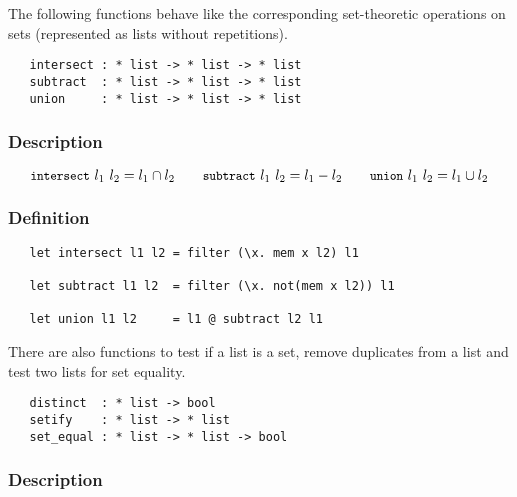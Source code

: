 \noindent The following functions behave like the corresponding
set-theoretic operations on sets
(represented as
lists without repetitions).

\begin{boxed}
\begin{verbatim}
   intersect : * list -> * list -> * list
   subtract  : * list -> * list -> * list
   union     : * list -> * list -> * list
\end{verbatim}\end{boxed}

\subsubsection*{Description}

\[ \ml{intersect}\ l_1\ l_2 = l_1\cap l_2 \qquad
\ml{subtract}\ l_1\ l_2 = l_1-l_2 \qquad
\ml{union}\ l_1\ l_2 = l_1\cup l_2 \]

\subsubsection*{Definition}

\begin{hol}\begin{verbatim}
   let intersect l1 l2 = filter (\x. mem x l2) l1

   let subtract l1 l2  = filter (\x. not(mem x l2)) l1

   let union l1 l2     = l1 @ subtract l2 l1
\end{verbatim}\end{hol}


\noindent There are also functions to test if a list is a set, remove
duplicates from a list and test two lists for set equality.

\begin{boxed}
\begin{verbatim}
   distinct  : * list -> bool
   setify    : * list -> * list
   set_equal : * list -> * list -> bool
\end{verbatim}\end{boxed}

\subsubsection*{Description}

